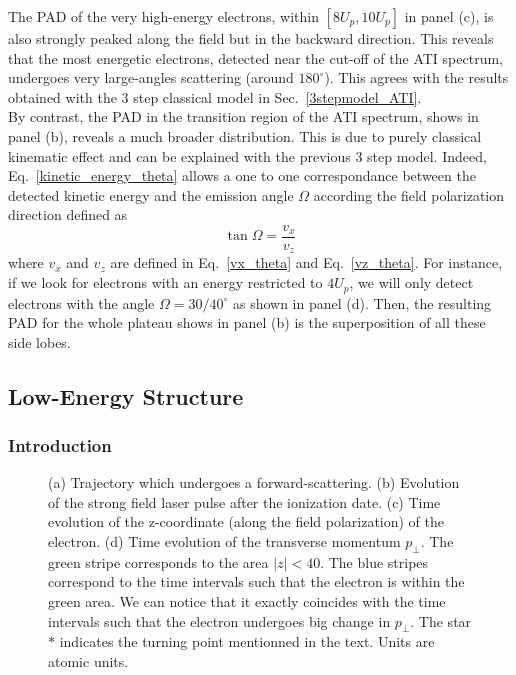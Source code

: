 \documentclass[a4paper]{article}
\begin{document}
The PAD of the very high-energy electrons, within $[8U_{p}, 10U_{p}]$ in panel (c), is also strongly peaked along the field but in the backward direction. This reveals that the most energetic electrons, detected near the cut-off of the ATI spectrum, undergoes very large-angles scattering (around $180^{\circ}$). This agrees with the results obtained with the 3 step classical model in Sec.~\ref{3stepmodel_ATI}.  \\
By contrast, the PAD in the transition region of the ATI spectrum, shows in panel (b), reveals a much broader distribution. This is due to purely classical kinematic effect and can be explained with the previous 3 step model. Indeed, Eq.~\ref{kinetic_energy_theta} allows a one to one correspondance between the detected kinetic energy and the emission angle $\Omega$ according the field polarization direction defined as
\begin{equation}
\tan{\Omega}=\frac{v_{x}}{v_{z}}
\end{equation}
where $v_{x}$ and $v_{z}$ are defined in Eq.~\ref{vx_theta} and Eq.~\ref{vz_theta}.
For instance, if we look for electrons with an energy restricted to $4U_{p}$, we will only detect electrons with the angle $\Omega=30/40^{\circ}$ as shown in panel (d). Then, the resulting PAD for the whole plateau shows in panel (b) is the superposition of all these side lobes.


\subsection{Low-Energy Structure}
\subsubsection{Introduction}
\label{soft_rescattering_section}
\begin{figure}[htp]
 \resizebox{1\textwidth}{!}{}
 \caption{ (a) Trajectory which undergoes a forward-scattering. (b) Evolution of the strong field laser pulse after the ionization date. (c) Time evolution of the z-coordinate (along the field polarization) of the electron. (d) Time evolution of the transverse momentum $p_{\perp}$. The green stripe corresponds to the area $|z|<40$. The blue stripes correspond to the time intervals such that the electron is within the green area. We can notice that it exactly coincides with the time intervals such that the electron undergoes big change in $p_{\perp}$. The star $*$ indicates the turning point mentionned in the text. Units are atomic units.}
 \label{soft_recollision}
\end{figure}
\end{document}
